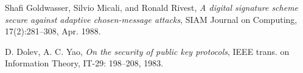 \begin{thebibliography}{9}
  Shafi Goldwasser, Silvio Micali, and Ronald Rivest,
  \emph{A digital signature scheme secure against adaptive chosen-message attacks},  SIAM Journal on Computing,
  17(2):281–308,
  Apr. 1988.
  
  D. Dolev, A. C. Yao,
  \emph{On the security of public key protocols},
  IEEE trans. on Information Theory,
  IT-29: 198–208,
  1983.
\end{thebibliography}